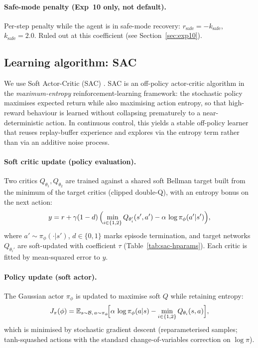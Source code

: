 \paragraph{Safe-mode penalty (Exp~10 only, not default).}
Per-step penalty while the agent is in safe-mode recovery: $r_\text{safe} = -k_\text{safe}$, $k_\text{safe}=2.0$.
Ruled out at this coefficient (see Section~\ref{sec:exp10}).

\subsection{Learning algorithm: SAC}
\label{sec:sac}

We use Soft Actor-Critic (SAC) \cite{haarnoja2018sac}.
SAC is an off-policy actor-critic algorithm in the \emph{maximum-entropy} reinforcement-learning framework:
the stochastic policy maximises expected return while also maximising action entropy, so that high-reward behaviour is learned without collapsing prematurely to a near-deterministic action.
In continuous control, this yields a stable off-policy learner that reuses replay-buffer experience and explores via the entropy term rather than via an additive noise process.

\paragraph{Soft critic update (policy evaluation).}
Two critics $Q_{\theta_1},Q_{\theta_2}$ are trained against a shared soft Bellman target built from the minimum of the target critics (clipped double-Q), with an entropy bonus on the next action:
\begin{equation}
  y = r + \gamma(1-d)\,
  \Bigl(
    \min_{i\in\{1,2\}} Q_{\theta_i'}(s',a')
    - \alpha\,\log\pi_\phi(a'|s')
  \Bigr),
  \label{eq:sac-soft-bellman}
\end{equation}
where $a'\sim\pi_\phi(\cdot|s')$, $d\in\{0,1\}$ marks episode termination, and target networks $Q_{\theta_i'}$ are soft-updated with coefficient $\tau$ (Table~\ref{tab:sac-hparams}).
Each critic is fitted by mean-squared error to $y$.

\paragraph{Policy update (soft actor).}
The Gaussian actor $\pi_\phi$ is updated to maximise soft $Q$ while retaining entropy:
\begin{equation}
  J_\pi(\phi)
  = \mathbb{E}_{s\sim\mathcal{B},\,a\sim\pi_\phi}\!
  \Bigl[
    \alpha\,\log\pi_\phi(a|s)
    - \min_{i\in\{1,2\}} Q_{\theta_i}(s,a)
  \Bigr],
  \label{eq:sac-policy}
\end{equation}
which is minimised by stochastic gradient descent (reparameterised samples; tanh-squashed actions with the standard change-of-variables correction on $\log\pi$).

